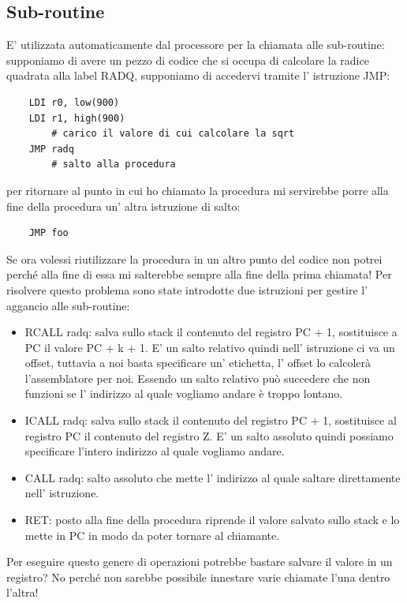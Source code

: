 \subsection{Sub-routine}
E' utilizzata automaticamente dal processore per la chiamata alle sub-routine: supponiamo di avere un pezzo di codice che si occupa di calcolare la radice quadrata alla label RADQ, supponiamo di accedervi tramite l' istruzione JMP:
\begin{verbatim}
    LDI r0, low(900)
    LDI r1, high(900)
        # carico il valore di cui calcolare la sqrt
    JMP radq
        # salto alla procedura
\end{verbatim}
per ritornare al punto in cui ho chiamato la procedura mi servirebbe porre alla fine della procedura un' altra istruzione di salto:
\begin{verbatim}
    JMP foo
\end{verbatim}
Se ora volessi riutilizzare la procedura in un altro punto del codice non potrei perché alla fine di essa mi salterebbe sempre alla fine della prima chiamata!
Per risolvere questo problema sono state introdotte due istruzioni per gestire l' aggancio alle sub-routine:
\begin{itemize}
    \item RCALL radq: salva sullo stack il contenuto del registro PC + 1, sostituisce a PC il valore PC + k + 1.
    E' un salto relativo quindi nell' istruzione ci va un offset, tuttavia a noi basta specificare un' etichetta, l' offset lo calcolerà l'assemblatore per noi.
    Essendo un salto relativo può succedere che non funzioni se l' indirizzo al quale vogliamo andare è troppo lontano.

    \item ICALL radq: salva sullo stack il contenuto del registro PC + 1, sostituisce al registro PC il contenuto del registro Z.
    E' un salto assoluto quindi possiamo specificare l'intero indirizzo al quale vogliamo andare.

    \item CALL radq: salto assoluto che mette l' indirizzo al quale saltare direttamente nell' istruzione.

    \item RET: posto alla fine della procedura riprende il valore salvato sullo stack e lo mette in PC in modo da poter tornare al chiamante.
\end{itemize}
Per eseguire questo genere di operazioni potrebbe bastare salvare il valore in un registro?
No perché non sarebbe possibile innestare varie chiamate l'una dentro l'altra!

